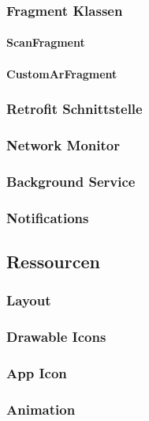 \documentclass{scrartcl}
\begin{document}
\subsubsection{Fragment Klassen}

\paragraph{ScanFragment}

\paragraph{CustomArFragment}

\subsubsection{Retrofit Schnittstelle}

\subsubsection{Network Monitor}

\subsubsection{Background Service}

\subsubsection{Notifications}

\subsection{Ressourcen}

\subsubsection{Layout}

\subsubsection{Drawable Icons}

\subsubsection{App Icon}

\subsubsection{Animation}
\end{document}

